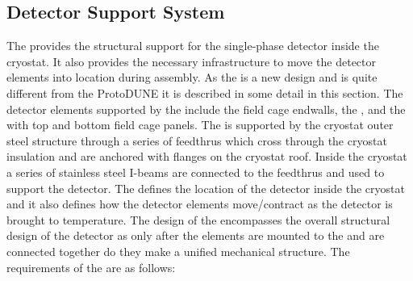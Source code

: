 \subsection{Detector Support System}

The  provides the structural support for the single-phase
detector inside the cryostat.  It also provides the necessary
infrastructure to move the detector elements into location during
assembly. As the  is a new design and is quite different
from the ProtoDUNE  it is described in some detail in this
section. The detector elements supported by the  include
the field cage endwalls, the , and the  with
top and bottom field cage panels.  The  is supported by the
cryostat outer steel structure through a series of feedthrus which
cross through the cryostat insulation and are anchored with flanges on
the cryostat roof. Inside the cryostat a series of stainless steel
I-beams are connected to the feedthrus and used to support the
detector. The  defines the location of the detector inside
the cryostat and it also defines how the detector elements
move/contract as the detector is brought to 
temperature. The design of the  encompasses the overall
structural design of the detector as only after the elements are
mounted to the  and are connected together do they make a
unified mechanical structure. The requirements of the  are
as follows:
